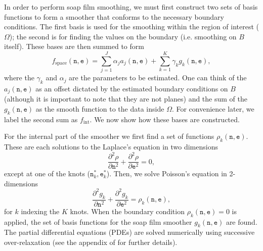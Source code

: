 In order to perform soap film smoothing, we must first construct two sets of basis functions to form a smoother that conforms to the necessary boundary conditions. The first basis is used for the smoothing within the region of interest ($\Omega$); the second is for finding the values on the boundary (i.e. smoothing on $B$ itself). These bases are then summed to form
$$
f_\text{space}(\texttt{n},\texttt{e})=\sum_{j=1}^J \alpha_j a_j(\texttt{n},\texttt{e}) + \sum_{k=1}^K \gamma_k g_k(\texttt{n},\texttt{e}),
$$
where the $\gamma_k$ and $\alpha_j$ are the parameters to be estimated. One can think of the $a_j(\texttt{n},\texttt{e})$ as an offset dictated by the estimated boundary conditions on $B$ (although it is important to note that they are not planes) and the sum of the $g_k(\texttt{n},\texttt{e})$ as the smooth function to the data inside $\Omega$. For convenience later, we label the second sum as $f_\text{int}$. We now show how these bases are constructed.

For the internal part of the smoother we first find a set of functions $\rho_k(\texttt{n},\texttt{e})$. These are each solutions to the Laplace's equation in two dimensions
$$
\frac{\partial^2\rho}{\partial \texttt{n}^2} + \frac{\partial^2\rho}{\partial \texttt{e}^2} = 0,
$$
except at one of the knots ($\texttt{n}^*_k,\texttt{e}^*_k$). Then, we solve Poisson's equation in 2-dimensions
\begin{equation}
\frac{\partial^2 g_k}{\partial \texttt{n}^2} + \frac{\partial^2 g_k}{\partial \texttt{e}^2} = \rho_k(\texttt{n},\texttt{e}),
\label{soap-poisson}
\end{equation}
for $k$ indexing the $K$ knots. When the boundary condition $\rho_k(\texttt{n},\texttt{e})=0$ is applied, the set of basis functions for the soap film smoother $g_k(\texttt{n},\texttt{e})$ are found.  The partial differential equations (PDEs) are solved numerically using successive over-relaxation (see the appendix of \cite{soap} for further details).

